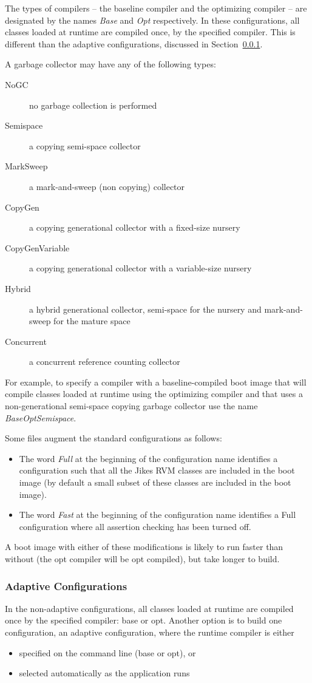 The types of compilers -- the baseline compiler and 
the optimizing compiler -- are designated by the names {\em Base}
and {\em Opt} respectively.  In these configurations,
all classes loaded at runtime are compiled once, by the specified
compiler.  This is different than the adaptive configurations,
discussed in Section~\ref{adaptive-configs}.

A garbage collector may have any of the following types:

\begin{description}
\item[NoGC] no garbage collection is performed
\item[Semispace] a copying semi-space collector
\item[MarkSweep] a mark-and-sweep (non copying) collector
\item[CopyGen] a copying generational collector with a
fixed-size nursery
\item[CopyGenVariable] a copying generational collector with a
variable-size nursery
\item[Hybrid] a hybrid generational collector, semi-space for the
nursery and mark-and-sweep for the mature space
\item[Concurrent] a concurrent reference counting collector
\end{description}

For example, to specify a compiler with a baseline-compiled boot image
that will 
compile classes loaded at runtime using the optimizing compiler and that uses
a non-generational semi-space copying garbage collector use the name 
{\em BaseOptSemispace}.

Some files augment the standard configurations as follows:
\begin{itemize}
\item The word 
{\em Full} at the beginning of the configuration name identifies a 
configuration
such that all the Jikes RVM classes are included in the boot image (by default
a small subset of these classes are included in the boot image). 
\item The word
{\em Fast} at the beginning of the configuration name identifies a Full
configuration where all assertion checking has been turned off. 
\end{itemize}
A boot image with
either of these modifications is likely to run faster than without
(the opt compiler will be opt compiled),
but take longer to build.  

\subsubsection{Adaptive Configurations} \label{adaptive-configs}
In the non-adaptive configurations, all classes
loaded at runtime are compiled once by the specified
compiler: base or opt.  Another option is to build one configuration,
an adaptive configuration,
where the runtime compiler is either
\begin{itemize}
\item specified on the command line (base or opt), or
\item selected automatically as the application runs
\end{itemize}

